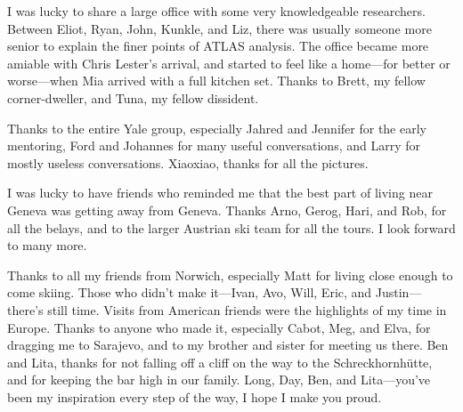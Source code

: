 I was lucky to share a large office with some very knowledgeable researchers.
Between Eliot, Ryan, John, Kunkle, and Liz, there was usually someone more senior to explain the finer points of ATLAS analysis.
The office became more amiable with Chris Lester's arrival, and started to feel like a home---for better or worse---when Mia arrived with a full kitchen set.
Thanks to Brett, my fellow corner-dweller, and Tuna, my fellow dissident.

Thanks to the entire Yale group, especially Jahred and Jennifer for the early mentoring, Ford and Johannes for many useful conversations, and Larry for mostly useless conversations. Xiaoxiao, thanks for all the pictures.


I was lucky to have friends who reminded me that the best part of living near Geneva was getting away from Geneva.
Thanks Arno, Gerog, Hari, and Rob, for all the belays, and to the larger Austrian ski team for all the tours. I look forward to many more.

Thanks to all my friends from Norwich, especially Matt for living close enough to come skiing. Those who didn't make it---Ivan, Avo, Will, Eric, and Justin---there's still time.
Visits from American friends were the highlights of my time in Europe. Thanks to anyone who made it, especially Cabot, Meg, and Elva, for dragging me to Sarajevo, and to my brother and sister for meeting us there. Ben and Lita, thanks for not falling off a cliff on the way to the Schreckhornh\"utte, and for keeping the bar high in our family.
Long, Day, Ben, and Lita---you've been my inspiration every step of the way, I hope I make you proud.





